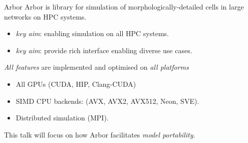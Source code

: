\documentclass[aspectratio=43]{beamer}
\newcommand{\arbor}{{\ttfamily Arbor}\xspace}
\begin{document}
\begin{frame}[fragile]{\arbor}
    \arbor is library for simulation of morphologically-detailed cells in large networks on HPC systems.
    \begin{itemize}
        \item \emph{key aim}: enabling simulation on all HPC systems.
        \item \emph{key aim}: provide rich interface enabling diverse use cases.
    \end{itemize}

    \vspace{10pt}
    \emph{All features} are implemented and optimised on \emph{all platforms}
    \begin{itemize}
        \item All GPUs (CUDA, HIP, Clang-CUDA)
        \item SIMD CPU backends: (AVX, AVX2, AVX512, Neon, SVE).
        \item Distributed simulation (MPI).
    \end{itemize}
    \vspace{10pt}
    This talk will focus on how \arbor facilitates \emph{model portability}.

\end{frame}
\end{document}
